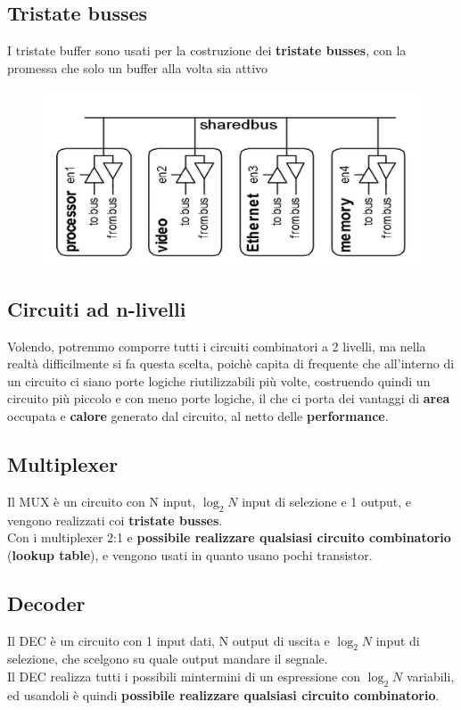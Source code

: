 \documentclass{report}
\begin{document}
    \subsection{Tristate busses}
        I tristate buffer sono usati per la costruzione dei \textbf{tristate busses},
        con la promessa che solo un buffer alla volta sia attivo
        \begin{center}
            \begin{figure}[H]
                \includegraphics[width=\textwidth]{tristatebusses.png}
            \end{figure}
        \end{center}      
    \subsection{Circuiti ad n-livelli}
        Volendo, potremmo comporre tutti i circuiti combinatori a 2 livelli, 
        ma nella realtà difficilmente si fa questa scelta, poichè capita di 
        frequente che all'interno di un circuito ci siano porte logiche riutilizzabili
        più volte, costruendo quindi un circuito più piccolo e con meno porte logiche, 
        il che ci porta dei vantaggi di \textbf{area} occupata e \textbf{calore} generato dal circuito,
        al netto delle \textbf{performance}.
    \subsection{Multiplexer}
        Il MUX è un circuito con N input, $\log_2N$ input di selezione e 
        1 output, e vengono realizzati coi \textbf{tristate busses}. \\
        Con i multiplexer 2:1 e \textbf{possibile realizzare qualsiasi circuito combinatorio} 
        (\textbf{lookup table}), e vengono usati in quanto usano pochi transistor.
    \subsection{Decoder}
        Il DEC è un circuito con 1 input dati, N output di uscita e $\log_2N$
        input di selezione, che scelgono su quale output mandare il segnale. \\
        Il DEC realizza tutti i possibili mintermini di un espressione con $\log_2N$
        variabili, ed usandoli è quindi \textbf{possibile realizzare qualsiasi circuito combinatorio}.
\end{document}
